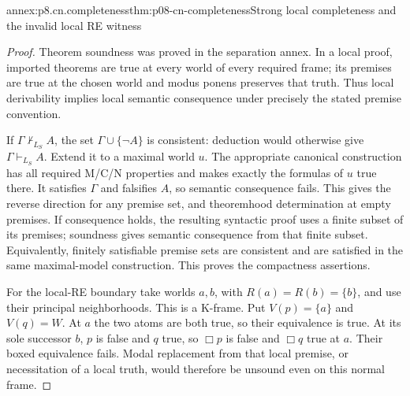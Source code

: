 \begin{annexitem}{annex:p8.cn.completeness}{thm:p08-cn-completeness}{Strong local completeness and the invalid local RE witness}
\begin{proof}
Theorem soundness was proved in the separation annex. In a local
proof, imported theorems are true at every world of every required
frame; its premises are true at the chosen world and modus ponens
preserves that truth. Thus local derivability implies local
semantic consequence under precisely the stated premise convention.

If \(\Gamma\nvdash_{L_S}A\), the set
\(\Gamma\cup\{\neg A\}\) is consistent: deduction
would otherwise give \(\Gamma\vdash_{L_S}A\).
Extend it to a maximal world \(u\). The appropriate canonical
construction has all required M/C/N properties and makes exactly
the formulas of \(u\) true there. It satisfies \(\Gamma\)
and falsifies \(A\), so semantic consequence fails. This gives
the reverse direction for any premise set, and theoremhood
determination at empty premises. If consequence holds, the
resulting syntactic proof uses a finite subset of its premises;
soundness gives semantic consequence from that finite subset.
Equivalently, finitely satisfiable premise sets are consistent and
are satisfied in the same maximal-model construction. This proves
the compactness assertions.

For the local-RE boundary take worlds \(a,b\), with
\(R(a)=R(b)=\{b\}\), and use their principal neighborhoods.
This is a K-frame. Put \(V(p)=\{a\}\) and \(V(q)=W\).
At \(a\) the two atoms are both true, so their equivalence is
true. At its sole successor \(b\), \(p\) is false and \(q\)
true, so \(\Box p\) is false and \(\Box q\) true at \(a\).
Their boxed equivalence fails. Modal replacement from that local
premise, or necessitation of a local truth, would therefore be
unsound even on this normal frame.
\end{proof}
\end{annexitem}

